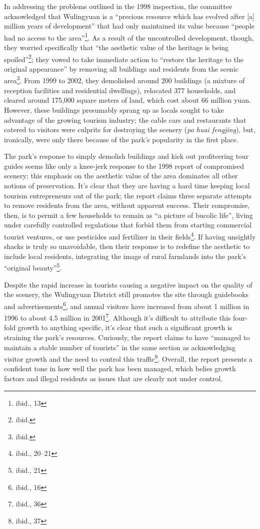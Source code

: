In addressing the problems outlined in the 1998 inspection, the committee
acknowledged that Wulingyuan is a ``precious resource which has evolved after
[a] million years of development'' that had only maintained its value because
``people had no access to the area''\footnote{ibid., 13}. As a result of the
uncontrolled development, though, they worried specifically that ``the aesthetic
value of the heritage is being spoiled''\footnote{ibid.}; they vowed to take
immediate action to ``restore the heritage to the original appearance'' by
removing all buildings and residents from the scenic area\footnote{ibid.}. From
1999 to 2002, they demolished around 200 buildings (a mixture of reception
facilities and residential dwellings), relocated 377 households, and cleared
around 175,000 square meters of land, which cost about 66 million yuan. However,
these buildings presumably sprang up as locals sought to take advantage of the
growing tourism industry; the cable cars and restaurants that catered to
visitors were culprits for destroying the scenery (\textit{po huai fengjing}),
but, ironically, were only there because of the park's popularity in the first
place.

The park's response to simply demolish buildings and kick out profiteering tour
guides seems like only a knee-jerk response to the 1998 report of compromised
scenery; this emphasis on the aesthetic value of the area dominates all other
notions of preservation. It's clear that they are having a hard time keeping
local tourism entrepreneurs out of the park; the report claims three separate
attempts to remove residents from the area, without apparent success. Their
compromise, then, is to permit a few households to remain as ``a picture of
bucolic life'', living under carefully controlled regulations that forbid them
from starting commercial tourist ventures, or use pesticides and fertilizer in
their fields\footnote{ibid., 20--21}. If having unsightly shacks is truly so
unavoidable, then their response is to redefine the aesthetic to include local
residents, integrating the image of rural farmlands into the park's ``original
beauty''\footnote{ibid., 21}.

Despite the rapid increase in tourists causing a negative impact on the quality
of the scenery, the Wulingyuan District still promotes the site through
guidebooks and advertisements\footnote{ibid., 16}, and annual visitors have
increased from about 1 million in 1996 to  about 4.5 million in
2001\footnote{ibid., 36}.  Although it's difficult to attribute this four-fold
growth to anything specific, it's clear that such a significant growth is
straining the park's resources. Curiously, the report claims to have ``managed
to maintain a stable number of tourists'' in the same section as acknowledging
visitor growth and the need to control this traffic\footnote{ibid., 37}.
Overall, the report presents a confident tone in how well the park has been
managed, which belies growth factors and illegal residents as issues that are
clearly not under control.

